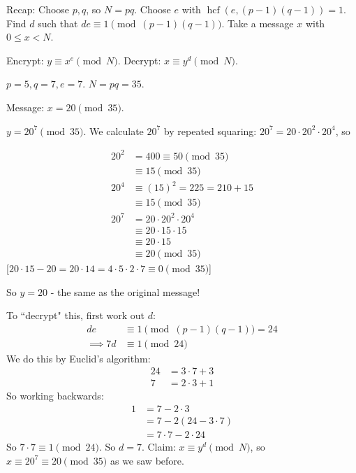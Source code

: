 \documentclass[twoside]{scrartcl}
\DeclareMathOperator{\hcf}{hcf}
\begin{document}
Recap: Choose $p,q$, so $N = pq$. Choose $e$ with $\hcf(e,(p-1)(q-1)) = 1$. Find $d$ such that $de \equiv 1 \pmod{(p-1)(q-1)}$. Take a message $x$ with $ 0 \leq x < N$. 

Encrypt: $y \equiv x^e \pmod{N}$. Decrypt: $x \equiv y^d \pmod{N}$.\\

\begin{example}
$p  = 5, q = 7, e = 7$. $N = pq = 35$. 

Message: $x = 20 \pmod{35}$. 

$y = 20^7 \pmod{35}$. We calculate $20^7$ by repeated squaring: $20^7 = 20\cdot 20^2 \cdot 20^4$, so 

\[
\begin{aligned}
  20^2 &= 400 \equiv 50 \pmod{35}\\
  &\equiv 15 \pmod{35}\\[0.2cm]
  20^4 &\equiv (15)^2 = 225 = 210 + 15\\
  &\equiv 15 \pmod{35}\\[0.2cm]
  20^7 &= 20\cdot 20^2 \cdot 20^4\\
  &\equiv 20\cdot 15 \cdot 15\\
  &\equiv 20 \cdot 15\\
  &\equiv 20 \pmod{35}
\end{aligned}
\]
[$20 \cdot 15 - 20 = 20 \cdot 14 = 4\cdot 5\cdot 2 \cdot 7 \equiv 0 \pmod{35}$]

So $y = 20$ - the same as the original message! 

To ``decrypt" this, first work out $d$: 
\[\begin{aligned}de &\equiv 1 \pmod{(p-1)(q-1)} = 24\\
\implies 7d &\equiv 1 \pmod{24}\end{aligned}\]
We do this by Euclid's algorithm: 
\[
\begin{aligned}
  24 &= 3 \cdot 7 + 3\\
  7&= 2\cdot 3 + 1
\end{aligned}
\]
So working backwards:
\[
\begin{aligned}
  1 &= 7 - 2\cdot 3\\
  &= 7 - 2(24 - 3\cdot 7)\\
  &= 7\cdot 7 - 2 \cdot 24
\end{aligned}
\]
So $7 \cdot 7 \equiv 1 \pmod{24}.$ So $d = 7$. Claim: $x \equiv y^d \pmod{N}$, so $x \equiv 20^7 \equiv 20 \pmod{35}$ as we saw before. 
\end{example}
\end{document}
